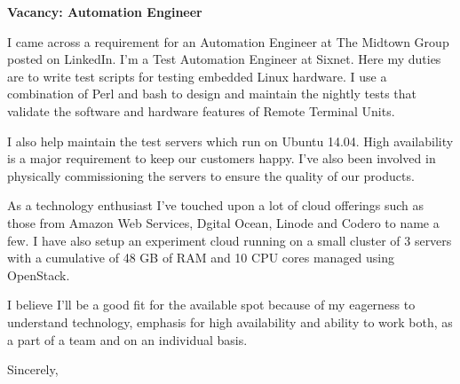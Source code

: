 \documentclass[14pt]{extletter}
\begin{document}
\begin{letter}{}

\opening{\textbf{Vacancy: Automation Engineer}}
 
I came across a requirement for an Automation Engineer at The Midtown Group
posted on LinkedIn. I'm a Test Automation Engineer at Sixnet. Here my duties
are to write test scripts for testing embedded Linux hardware. I use a
combination of Perl and bash to design and maintain the nightly tests that
validate the software and hardware features of Remote Terminal Units.

I also help maintain the test servers which run on Ubuntu 14.04. High
availability is a major requirement to keep our customers happy. I've also been
involved in physically commissioning the servers to ensure the quality of our
products.

As a technology enthusiast I've touched upon a lot of cloud offerings such as
those from Amazon Web Services, Dgital Ocean, Linode and Codero to name a few.
I have also setup an experiment cloud running on a small cluster of 3 servers
with a cumulative of 48 GB of RAM and 10 CPU cores managed using OpenStack.

I believe I'll be a good fit for the available spot because of my eagerness
to understand technology, emphasis for high availability and ability to work
both, as a part of a team and on an individual basis.

\vspace{2\parskip} %
\closing{Sincerely,}
\vspace{2\parskip} %

\end{letter}
 
\end{document}
